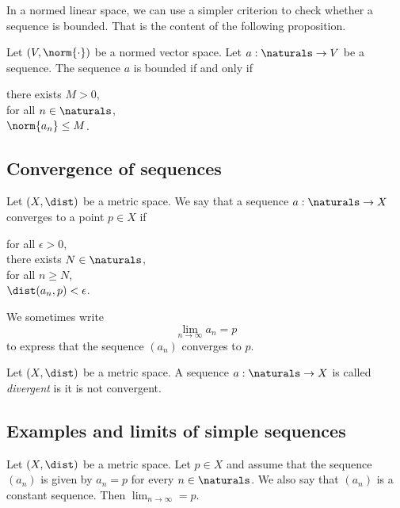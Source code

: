 In a normed linear space, we can use a simpler criterion to check whether a sequence is bounded. That is the content of the
following proposition.

\begin{proposition}
    Let $(V, \norm{\cdot})$ be a normed vector space. Let $a: \naturals \to V$ be a sequence. The sequence $a$ is bounded
    if and only if
    \begin{center}
        \parbox{\linewidth}{
            \linewidth
            there exists $M > 0$, \\
            \tab for all $n \in \naturals$, \\
            \tab\tab $\norm{a_n} \le M$.
        }
    \end{center}
\end{proposition}

\subsection{Convergence of sequences}
\begin{definition}
    Let $(X, \dist)$ be a metric space. We say that a sequence $a: \naturals \to X$ converges to a point $p \in X$ if
    \begin{center}
        \parbox{\linewidth}{
            \linewidth
            for all $\epsilon > 0$, \\
            \tab there exists $N \in \naturals$, \\
            \tab\tab for all $n \ge N$, \\
            \tab\tab\tab $\dist(a_n,p) < \epsilon$.
        }
    \end{center}
\end{definition}

We sometimes write 
$$\lim_{n\to\infty}a_n = p$$
to express that the sequence $(a_n)$ converges to $p$.

\begin{definition}
    Let $(X, \dist)$ be a metric space. A sequence $a: \naturals \to X$ is called \emph{divergent} is it is not convergent.
\end{definition}

\subsection{Examples and limits of simple sequences}
\begin{proposition}
    Let $(X, \dist)$ be a metric space. Let $p \in X$ and assume that the sequence $(a_n)$ is given by $a_n = p$ for every
    $n \in \naturals$. We also say that $(a_n)$ is a constant sequence. Then $\lim_{n\to\infty} = p$.
\end{proposition}

